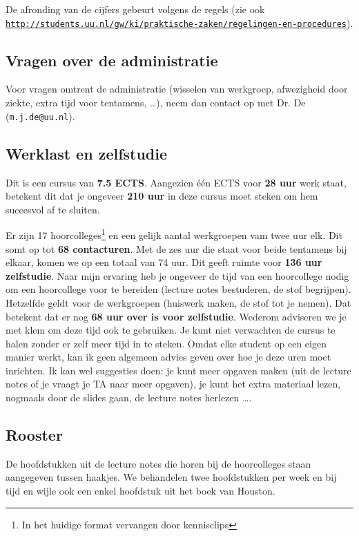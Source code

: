 De afronding van de cijfers gebeurt volgens de regels
(zie ook \href{http://students.uu.nl/gw/ki/praktische-zaken/regelingen-en-procedures}{\texttt{http://students.uu.nl/gw/ki/praktische-zaken/regelingen-en-procedures}}).

\subsection*{Vragen over de administratie}

Voor vragen omtrent de administratie (wisselen van werkgroep, afwezigheid door ziekte, extra tijd voor tentamens, \dots), neem dan contact op met Dr. De (\texttt{m.j.de@uu.nl}).

\subsection*{Werklast en zelfstudie}

Dit is een cursus van \textbf{7.5 ECTS}.
Aangezien één ECTS voor \textbf{28 uur} werk staat, betekent dit dat je ongeveer \textbf{210 uur} in deze cursus moet steken om hem succesvol af te sluiten.

Er zijn 17 hoorcolleges\footnote{%
  In het huidige format vervangen door kennisclips}
en een gelijk aantal werkgroepen vam twee uur elk.
Dit somt op tot \textbf{68 contacturen}.
Met de zes uur die staat voor beide tentamens bij elkaar, komen we op een totaal van 74 uur.
Dit geeft ruimte voor \textbf{136 uur zelfstudie}.
Naar mijn ervaring heb je ongeveer de tijd van een hoorcollege nodig om een hoorcollege voor te bereiden (lecture notes bestuderen, de stof begrijpen).
Hetzelfde geldt voor de werkgroepen (huiswerk maken, de stof tot je nemen).
Dat betekent dat er nog \textbf{68 uur over is voor zelfstudie}.
Wederom adviseren we je met klem om deze tijd ook te gebruiken.
Je kunt niet verwachten de cursus te halen zonder er zelf meer tijd in te steken.
Omdat elke student op een eigen manier werkt, kan ik geen algemeen advies geven over hoe je deze uren moet inrichten.
Ik kan wel suggesties doen: je kunt meer opgaven maken (uit de lecture notes of je vraagt je TA naar meer opgaven), je kunt het extra materiaal lezen, nogmaals door de slides gaan, de lecture notes herlezen \dots.

\subsection*{Rooster}

De hoofdstukken uit de lecture notes die horen bij de hoorcolleges staan aangegeven tussen haakjes.
We behandelen twee hoofdstukken per week en bij tijd en wijle ook een enkel hoofdstuk uit het boek van Houston.

